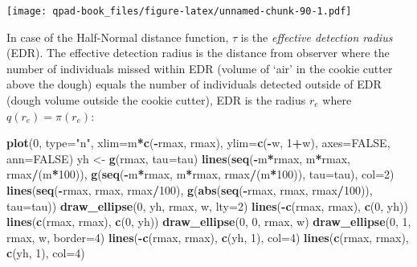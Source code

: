 \documentclass[12pt,]{book}
\newenvironment{Shaded}{\begin{snugshade}}{\end{snugshade}}
\newcommand{\DataTypeTok}[1]{\textcolor[rgb]{0.13,0.29,0.53}{#1}}
\newcommand{\DecValTok}[1]{\textcolor[rgb]{0.00,0.00,0.81}{#1}}
\newcommand{\KeywordTok}[1]{\textcolor[rgb]{0.13,0.29,0.53}{\textbf{#1}}}
\newcommand{\NormalTok}[1]{#1}
\newcommand{\OperatorTok}[1]{\textcolor[rgb]{0.81,0.36,0.00}{\textbf{#1}}}
\newcommand{\OtherTok}[1]{\textcolor[rgb]{0.56,0.35,0.01}{#1}}
\newcommand{\StringTok}[1]{\textcolor[rgb]{0.31,0.60,0.02}{#1}}
\begin{document}
\texttt{[image: qpad-book\_files/figure-latex/unnamed-chunk-90-1.pdf]}

In case of the Half-Normal distance function,
\(\tau\) is the \emph{effective detection radius} (EDR).
The effective detection radius is the distance from observer
where the number of individuals missed within EDR
(volume of `air' in the cookie cutter above the dough)
equals the number of individuals detected outside of EDR
(dough volume outside the cookie cutter),
EDR is the radius \(r_e\) where \(q(r_e)=\pi(r_e)\):

\begin{Shaded}
\begin{Highlighting}[]
\KeywordTok{plot}\NormalTok{(}\DecValTok{0}\NormalTok{, }\DataTypeTok{type=}\StringTok{"n"}\NormalTok{, }\DataTypeTok{xlim=}\NormalTok{m}\OperatorTok{*}\KeywordTok{c}\NormalTok{(}\OperatorTok{-}\NormalTok{rmax, rmax), }\DataTypeTok{ylim=}\KeywordTok{c}\NormalTok{(}\OperatorTok{-}\NormalTok{w, }\DecValTok{1}\OperatorTok{+}\NormalTok{w), }
  \DataTypeTok{axes=}\OtherTok{FALSE}\NormalTok{, }\DataTypeTok{ann=}\OtherTok{FALSE}\NormalTok{)}
\NormalTok{yh <-}\StringTok{ }\KeywordTok{g}\NormalTok{(rmax, }\DataTypeTok{tau=}\NormalTok{tau)}
\KeywordTok{lines}\NormalTok{(}\KeywordTok{seq}\NormalTok{(}\OperatorTok{-}\NormalTok{m}\OperatorTok{*}\NormalTok{rmax, m}\OperatorTok{*}\NormalTok{rmax, rmax}\OperatorTok{/}\NormalTok{(m}\OperatorTok{*}\DecValTok{100}\NormalTok{)),}
  \KeywordTok{g}\NormalTok{(}\KeywordTok{seq}\NormalTok{(}\OperatorTok{-}\NormalTok{m}\OperatorTok{*}\NormalTok{rmax, m}\OperatorTok{*}\NormalTok{rmax, rmax}\OperatorTok{/}\NormalTok{(m}\OperatorTok{*}\DecValTok{100}\NormalTok{)), }\DataTypeTok{tau=}\NormalTok{tau),}
  \DataTypeTok{col=}\DecValTok{2}\NormalTok{)}
\KeywordTok{lines}\NormalTok{(}\KeywordTok{seq}\NormalTok{(}\OperatorTok{-}\NormalTok{rmax, rmax, rmax}\OperatorTok{/}\DecValTok{100}\NormalTok{),}
  \KeywordTok{g}\NormalTok{(}\KeywordTok{abs}\NormalTok{(}\KeywordTok{seq}\NormalTok{(}\OperatorTok{-}\NormalTok{rmax, rmax, rmax}\OperatorTok{/}\DecValTok{100}\NormalTok{)), }\DataTypeTok{tau=}\NormalTok{tau))}
\KeywordTok{draw_ellipse}\NormalTok{(}\DecValTok{0}\NormalTok{, yh, rmax, w, }\DataTypeTok{lty=}\DecValTok{2}\NormalTok{)}
\KeywordTok{lines}\NormalTok{(}\OperatorTok{-}\KeywordTok{c}\NormalTok{(rmax, rmax), }\KeywordTok{c}\NormalTok{(}\DecValTok{0}\NormalTok{, yh))}
\KeywordTok{lines}\NormalTok{(}\KeywordTok{c}\NormalTok{(rmax, rmax), }\KeywordTok{c}\NormalTok{(}\DecValTok{0}\NormalTok{, yh))}
\KeywordTok{draw_ellipse}\NormalTok{(}\DecValTok{0}\NormalTok{, }\DecValTok{0}\NormalTok{, rmax, w)}
\KeywordTok{draw_ellipse}\NormalTok{(}\DecValTok{0}\NormalTok{, }\DecValTok{1}\NormalTok{, rmax, w, }\DataTypeTok{border=}\DecValTok{4}\NormalTok{)}
\KeywordTok{lines}\NormalTok{(}\OperatorTok{-}\KeywordTok{c}\NormalTok{(rmax, rmax), }\KeywordTok{c}\NormalTok{(yh, }\DecValTok{1}\NormalTok{), }\DataTypeTok{col=}\DecValTok{4}\NormalTok{)}
\KeywordTok{lines}\NormalTok{(}\KeywordTok{c}\NormalTok{(rmax, rmax), }\KeywordTok{c}\NormalTok{(yh, }\DecValTok{1}\NormalTok{), }\DataTypeTok{col=}\DecValTok{4}\NormalTok{)}
\end{Highlighting}
\end{Shaded}
\end{document}
